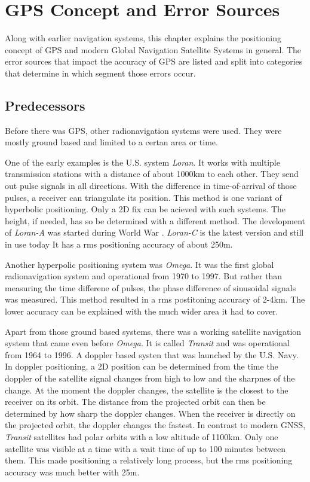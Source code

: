 \chapter{GPS Concept and Error Sources}

Along with earlier navigation systems, this chapter explains the positioning concept of GPS and modern Global Navigation Satellite Systems in general.
The error sources that impact the accuracy of GPS are listed and split into categories that determine in which segment those errors occur.


\section{Predecessors}
Before there was GPS, other radionavigation systems were used.
They were mostly ground based and limited to a certan area or time.

One of the early examples is the U.S. system \textit{Loran}.
It works with multiple transmission stations with a distance of about 1000km to each other.
They send out pulse signals in all directions.
With the difference in time-of-arrival of those pulses, a receiver can triangulate its position.
This method is one variant of hyperbolic positioning.
Only a 2D fix can be acieved with such systems.
The height, if needed, has so be determined with a different method.
The development of \textit{Loran-A} was started during World War .
\textit{Loran-C} is the latest version and still in use today
It has a rms positioning accuracy of about 250m.

Another hyperpolic positioning system was \textit{Omega}.
It was the first global radionavigation system and operational from 1970 to 1997.
But rather than measuring the time differene of pulses, the phase difference of sinusoidal signals was measured.
This method resulted in a rms postitoning accuracy of 2-4km.
The lower accuracy can be explained with the much wider area it had to cover.

Apart from those ground based systems, there was a working satellite navigation system that came even before \textit{Omega}.
It is called \textit{Transit} and was operational from 1964 to 1996.
A doppler based systen that was launched by the U.S. Navy.
In doppler positioning, a 2D position can be determined from the time the doppler of the satellite signal changes from high to low and the sharpnes of the change.
At the moment the doppler changes, the satellite is the closest to the receiver on its orbit.
The distance from the projected orbit can then be determined by how sharp the doppler changes.
When the receiver is directly on the projected orbit, the doppler changes the fastest.
In contrast to modern GNSS, \textit{Transit} satellites had polar orbits with a low altitude of 1100km.
Only one satellite was visible at a time with a wait time of up to 100 minutes between them.
This made positioning a relatively long process, but the rms positioning accuracy was much better with 25m.

